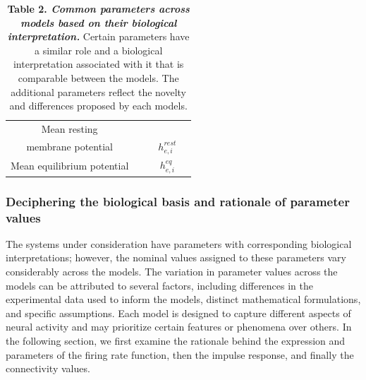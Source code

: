 \documentclass[12pt,twoside]{article}
\begin{document}
\begin{table}[thb]
\begin{tabular}{ccccc}
        \rowcolor{gray!20}
        Mean resting  & & & & \\
        \rowcolor{gray!20}
        membrane potential & & & \multirow{-2}{*}{$h_{e,i}^{rest}$}& \\
        \rowcolor{gray!70}
        Mean equilibrium potential & & & $h_{e,i}^{eq}$& \\
    \end{tabular}
        \caption*{\textbf{Table 2.  \textit{Common parameters across models based on their biological interpretation.}} Certain parameters have a similar role and a biological interpretation associated with it that is comparable between the models. The additional parameters reflect the novelty and differences proposed by each models.}  
    \label{tab:global_eval}
\end{table}


\subsubsection{Deciphering the biological basis and rationale of parameter values}
The systems under consideration have parameters with corresponding biological interpretations; however, the nominal values assigned to these parameters vary considerably across the models. The variation in parameter values across the models can be attributed to several factors, including differences in the experimental data used to inform the models, distinct mathematical formulations, and specific assumptions. Each model is designed to capture different aspects of neural activity and may prioritize certain features or phenomena over others. In the following section, we first examine the rationale behind the expression and parameters of the firing rate function, then the impulse response, and finally the connectivity values. 

\end{document}
